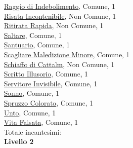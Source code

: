 \begin{multicols}{3}
{{\hyperlink{Raggio di Indebolimento}{Raggio di Indebolimento}, Comune, 1\\
\hyperlink{Risata Incontenibile}{Risata Incontenibile}, Non Comune, 1\\
\hyperlink{Ritirata Rapida}{Ritirata Rapida}, Non Comune, 1\\
\hyperlink{Saltare}{Saltare}, Comune, 1\\
\hyperlink{Santuario}{Santuario}, Comune, 1\\
\hyperlink{Scagliare Maledizione Minore}{Scagliare Maledizione Minore}, Comune, 1\\
\hyperlink{Schiaffo di Cattalm}{Schiaffo di Cattalm}, Non Comune, 1\\
\hyperlink{Scritto Illusorio}{Scritto Illusorio}, Comune, 1\\
\hyperlink{Servitore Invisibile}{Servitore Invisibile}, Comune, 1\\
\hyperlink{Sonno}{Sonno}, Comune, 1\\
\hyperlink{Spruzzo Colorato}{Spruzzo Colorato}, Comune, 1\\
\hyperlink{Unto}{Unto}, Comune, 1\\
\hyperlink{Vita Falsata}{Vita Falsata}, Comune, 1\\

\medskip Totale incantesimi: \theinclvuno\\

\textbf{Livello 2} 

}}
\end{multicols}
